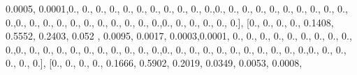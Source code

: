 \documentclass[
]{book}
\newenvironment{Shaded}{\begin{snugshade}}{\end{snugshade}}
\newcommand{\FloatTok}[1]{\textcolor[rgb]{0.00,0.00,0.81}{#1}}
\newcommand{\NormalTok}[1]{#1}
\begin{document}
\begin{Shaded}
\begin{Highlighting}[]
\FloatTok{0.0005}\NormalTok{, }\FloatTok{0.0001}\NormalTok{,}\FloatTok{0.}\NormalTok{, }\FloatTok{0.}\NormalTok{, }\FloatTok{0.}\NormalTok{, }\FloatTok{0.}\NormalTok{, }\FloatTok{0.}\NormalTok{, }\FloatTok{0.}\NormalTok{, }\FloatTok{0.}\NormalTok{, }\FloatTok{0.}\NormalTok{, }\FloatTok{0.}\NormalTok{, }\FloatTok{0.}\NormalTok{, }\FloatTok{0.}\NormalTok{,}\FloatTok{0.}\NormalTok{, }\FloatTok{0.}\NormalTok{, }\FloatTok{0.}\NormalTok{, }\FloatTok{0.}\NormalTok{, }\FloatTok{0.}\NormalTok{,}
\FloatTok{0.}\NormalTok{, }\FloatTok{0.}\NormalTok{, }\FloatTok{0.}\NormalTok{, }\FloatTok{0.}\NormalTok{, }\FloatTok{0.}\NormalTok{, }\FloatTok{0.}\NormalTok{,}\FloatTok{0.}\NormalTok{, }\FloatTok{0.}\NormalTok{, }\FloatTok{0.}\NormalTok{, }\FloatTok{0.}\NormalTok{, }\FloatTok{0.}\NormalTok{, }\FloatTok{0.}\NormalTok{, }\FloatTok{0.}\NormalTok{, }\FloatTok{0.}\NormalTok{, }\FloatTok{0.}\NormalTok{, }\FloatTok{0.}\NormalTok{, }\FloatTok{0.}\NormalTok{,}\FloatTok{0.}\NormalTok{, }\FloatTok{0.}\NormalTok{, }\FloatTok{0.}\NormalTok{,}
\FloatTok{0.}\NormalTok{, }\FloatTok{0.}\NormalTok{, }\FloatTok{0.}\NormalTok{], [}\FloatTok{0.}\NormalTok{, }\FloatTok{0.}\NormalTok{, }\FloatTok{0.}\NormalTok{, }\FloatTok{0.}\NormalTok{, }\FloatTok{0.1408}\NormalTok{, }\FloatTok{0.5552}\NormalTok{, }\FloatTok{0.2403}\NormalTok{, }\FloatTok{0.052}\NormalTok{ , }\FloatTok{0.0095}\NormalTok{, }\FloatTok{0.0017}\NormalTok{,}
\FloatTok{0.0003}\NormalTok{,}\FloatTok{0.0001}\NormalTok{, }\FloatTok{0.}\NormalTok{, }\FloatTok{0.}\NormalTok{, }\FloatTok{0.}\NormalTok{, }\FloatTok{0.}\NormalTok{, }\FloatTok{0.}\NormalTok{, }\FloatTok{0.}\NormalTok{, }\FloatTok{0.}\NormalTok{, }\FloatTok{0.}\NormalTok{, }\FloatTok{0.}\NormalTok{, }\FloatTok{0.}\NormalTok{,}\FloatTok{0.}\NormalTok{, }\FloatTok{0.}\NormalTok{, }\FloatTok{0.}\NormalTok{, }\FloatTok{0.}\NormalTok{, }\FloatTok{0.}\NormalTok{, }\FloatTok{0.}\NormalTok{,}
\FloatTok{0.}\NormalTok{, }\FloatTok{0.}\NormalTok{, }\FloatTok{0.}\NormalTok{, }\FloatTok{0.}\NormalTok{, }\FloatTok{0.}\NormalTok{,}\FloatTok{0.}\NormalTok{, }\FloatTok{0.}\NormalTok{, }\FloatTok{0.}\NormalTok{, }\FloatTok{0.}\NormalTok{, }\FloatTok{0.}\NormalTok{, }\FloatTok{0.}\NormalTok{, }\FloatTok{0.}\NormalTok{, }\FloatTok{0.}\NormalTok{, }\FloatTok{0.}\NormalTok{, }\FloatTok{0.}\NormalTok{, }\FloatTok{0.}\NormalTok{,}\FloatTok{0.}\NormalTok{, }\FloatTok{0.}\NormalTok{, }\FloatTok{0.}\NormalTok{, }\FloatTok{0.}\NormalTok{,}
\FloatTok{0.}\NormalTok{, }\FloatTok{0.}\NormalTok{], [}\FloatTok{0.}\NormalTok{, }\FloatTok{0.}\NormalTok{, }\FloatTok{0.}\NormalTok{, }\FloatTok{0.}\NormalTok{, }\FloatTok{0.1666}\NormalTok{, }\FloatTok{0.5902}\NormalTok{, }\FloatTok{0.2019}\NormalTok{, }\FloatTok{0.0349}\NormalTok{, }\FloatTok{0.0053}\NormalTok{, }\FloatTok{0.0008}\NormalTok{,}

\end{Highlighting}
\end{Shaded}
\end{document}
